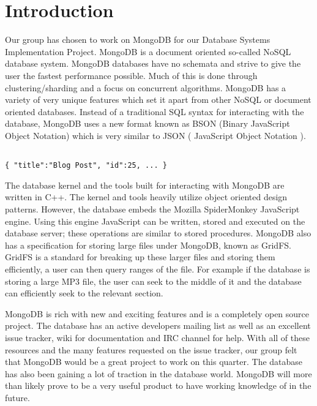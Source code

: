 \documentclass{../dependencies/acm_proc_article-sp}
\begin{document}
%

%

\section{Introduction}
Our group has chosen to work on MongoDB for our Database Systems
Implementation Project. MongoDB is a document oriented so-called NoSQL
database system. MongoDB databases have no schemata and strive to give the user
the fastest performance possible. Much of this is done through clustering/sharding
and a focus on concurrent algorithms. MongoDB has a variety of very unique
features which set it apart from other NoSQL or document oriented databases.
Instead of a traditional SQL syntax for interacting with the database, MongoDB uses
a new format known as BSON (Binary JavaScript Object Notation) which is very similar
to JSON ( JavaScript Object Notation ).
\begin{lstlisting}

{ "title":"Blog Post", "id":25, ... }
\end{lstlisting}
The database kernel and the tools built for interacting with MongoDB are written in
C++. The kernel and tools heavily utilize object oriented design patterns.
However, the database embeds the Mozilla SpiderMonkey JavaScript engine.
Using this engine JavaScript can be written, stored and executed on the database server; these
operations are similar to stored procedures. MongoDB also has a specification for storing
large files under MongoDB, known as GridFS. GridFS is a standard for breaking up these larger
files and storing them efficiently, a user can then query ranges of the file. For example if the
database is storing a large MP3 file, the user can seek to the middle of it and the database can
efficiently seek to the relevant section.

MongoDB is rich with new and exciting features and is a completely open source project.
The database has an active developers mailing list as well as an excellent issue tracker,
wiki for documentation and IRC channel for help. With all of these resources and
the many features requested on the issue tracker, our group felt that MongoDB would be a great
project to work on this quarter. The database has also been gaining a lot of traction in the
database world. MongoDB will more than likely prove to be a very useful product
to have working knowledge of in the future.
\end{document}
